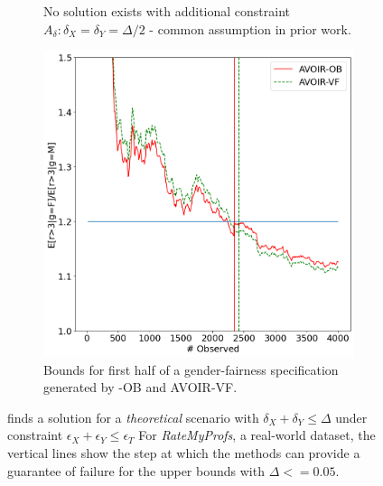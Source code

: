 \begin{figure}[ht]
\begin{subfigure}[b]{0.45\linewidth}
{}
        \caption{No solution exists with additional constraint $A_\delta: \delta_X = \delta_Y = \Delta/2$ - common assumption in prior work.}
        \label{fig:theoretical-example}
    \end{subfigure}
    \hfill
    \begin{subfigure}[b]{0.45\linewidth}
        \centering
        \includegraphics[width=\linewidth]{avoir/images/ratemyprofs.png}
        \caption{Bounds for first half of a gender-fairness specification generated by \AVOIRmethodname{}-OB and AVOIR-VF.}
        \label{fig:casestudy:rmp}
    \end{subfigure}
    \caption{\figleft{} \AVOIRmethodname{} finds a solution for a \textit{theoretical} scenario with $\delta_X + \delta_Y \leq \Delta$ under constraint $\epsilon_X + \epsilon_Y \leq \epsilon_T$ \figright{} For \textit{RateMyProfs}, a real-world dataset, the vertical lines show the step at which the methods can provide a guarantee of failure for the upper bounds with $\Delta <= 0.05$.}
    \label{fig:real-and-theoretical-examples}
\end{figure}


